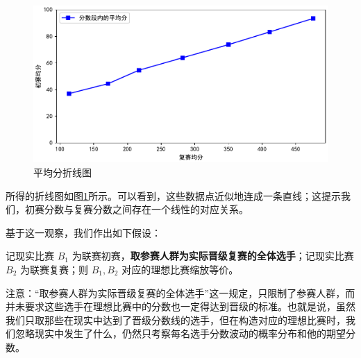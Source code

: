             \begin{figure}[htbp]
                \centering
                \includegraphics[width=\textwidth]{fig/plottingAvgScores.pdf}
                \caption{平均分折线图}
                \label{fig:plottingAvgScores}
            \end{figure}

            所得的折线图如图\ref{fig:plottingAvgScores}所示。可以看到，这些数据点近似地连成一条直线；这提示我们，初赛分数与复赛分数之间存在一个线性的对应关系。
            
            基于这一观察，我们作出如下假设：

            \begin{assumption}
                记现实比赛 $B_1$ 为联赛初赛，\textbf{取参赛人群为实际晋级复赛的全体选手}；记现实比赛 $B_2$ 为联赛复赛；则 $B_1,B_2$ 对应的理想比赛缩放等价。

                \label{ass:equivalenceBetweenTwoRounds}
            \end{assumption}

            注意：“取参赛人群为实际晋级复赛的全体选手”这一规定，只限制了参赛人群，而并未要求这些选手在理想比赛中的分数也一定得达到晋级的标准。也就是说，虽然我们只取那些在现实中达到了晋级分数线的选手，但在构造对应的理想比赛时，我们忽略现实中发生了什么，仍然只考察每名选手分数波动的概率分布和他的期望分数。

            \vspace{1.5ex}


